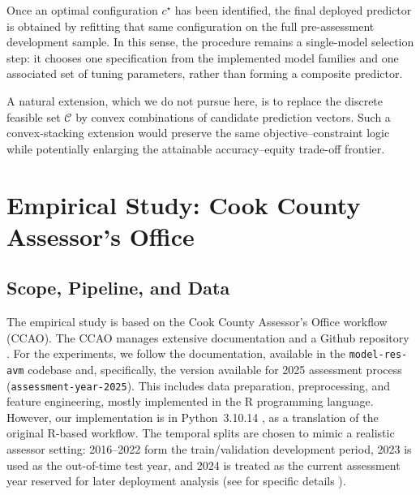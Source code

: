 \documentclass[12pt, draft]{article}
\theoremstyle{plain}
\theoremstyle{definition}
\newcommand{\1}{\mathbf{1}}
\begin{document}
Once an optimal configuration $c^\star$ has been identified, the final deployed predictor is obtained by refitting that same configuration on the full pre-assessment development sample. In this sense, the procedure remains a single-model selection step: it chooses one specification from the implemented model families and one associated set of tuning parameters, rather than forming a composite predictor.

A natural extension, which we do not pursue here, is to replace the discrete feasible set $\mathcal C$ by convex combinations of candidate prediction vectors. Such a convex-stacking extension would preserve the same objective--constraint logic while potentially enlarging the attainable accuracy--equity trade-off frontier.

\section{Empirical Study: Cook County Assessor's Office}
\label{sec:empirical}

\subsection{Scope, Pipeline, and Data}

The empirical study is based on the Cook County Assessor's Office workflow (CCAO). The CCAO manages extensive documentation and a Github repository . For the experiments, we follow the documentation, available in the \texttt{model-res-avm} codebase and, specifically, the version available for 2025 assessment process (\texttt{assessment-year-2025}). This includes data preparation, preprocessing, and feature engineering, mostly implemented in the R programming language. However, our implementation is in Python~3.10.14 , as a translation of the original R-based workflow. The temporal splits are chosen to mimic a realistic assessor setting: 2016--2022 form the train/validation development period, 2023 is used as the out-of-time test year, and 2024 is treated as the current assessment year reserved for later deployment analysis (see for specific details  ).

\end{document}
